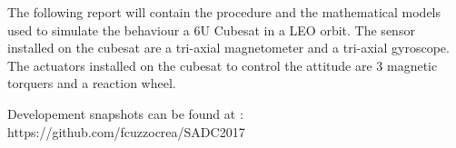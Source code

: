 The following report will contain the procedure and the mathematical models used to simulate the behaviour a 6U Cubesat in a LEO orbit.
The sensor installed on the cubesat are a tri-axial magnetometer and a tri-axial gyroscope. 
The actuators installed on the cubesat to control the attitude are 3 magnetic torquers and a reaction wheel.

Developement snapshots can be found at : https://github.com/fcuzzocrea/SADC2017
